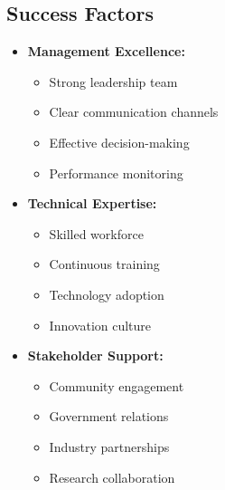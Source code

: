 \subsection{Success Factors}
\begin{itemize}
    \item \textbf{Management Excellence:}
    \begin{itemize}
        \item Strong leadership team
        \item Clear communication channels
        \item Effective decision-making
        \item Performance monitoring
    \end{itemize}
    
    \item \textbf{Technical Expertise:}
    \begin{itemize}
        \item Skilled workforce
        \item Continuous training
        \item Technology adoption
        \item Innovation culture
    \end{itemize}
    
    \item \textbf{Stakeholder Support:}
    \begin{itemize}
        \item Community engagement
        \item Government relations
        \item Industry partnerships
        \item Research collaboration
    \end{itemize}
\end{itemize} 
